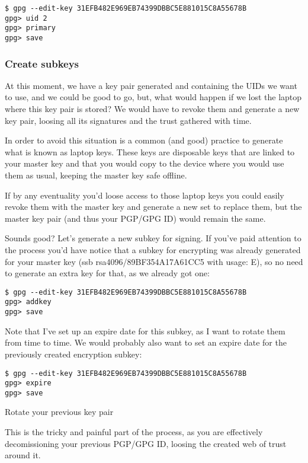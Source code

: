 \begin{verbatim}
$ gpg --edit-key 31EFB482E969EB74399DBBC5E881015C8A55678B
gpg> uid 2
gpg> primary
gpg> save
\end{verbatim}

\subsubsection{Create subkeys}

At this moment, we have a key pair generated and containing the UIDs we want to use, and we could be good to go, but, what would happen if we lost the laptop where this key pair is stored? We would have to revoke them and generate a new key pair, loosing all its signatures and the trust gathered with time.

In order to avoid this situation is a common (and good) practice to generate what is known as laptop keys. These keys are disposable keys that are linked to your master key and that you would copy to the device where you would use them as usual, keeping the master key safe offline.

If by any eventuality you’d loose access to those laptop keys you could easily revoke them with the master key and generate a new set to replace them, but the master key pair (and thus your PGP/GPG ID) would remain the same.

Sounds good? Let’s generate a new subkey for signing. If you’ve paid attention to the process you’d have notice that a subkey for encrypting was already generated for your master key (ssb rsa4096/89BF354A17A61CC5 with usage: E), so no need to generate an extra key for that, as we already got one:

\begin{verbatim}
$ gpg --edit-key 31EFB482E969EB74399DBBC5E881015C8A55678B
gpg> addkey
gpg> save
\end{verbatim}

Note that I’ve set up an expire date for this subkey, as I want to rotate them from time to time. We would probably also want to set an expire date for the previously created encryption subkey:

\begin{verbatim}
$ gpg --edit-key 31EFB482E969EB74399DBBC5E881015C8A55678B
gpg> expire
gpg> save
\end{verbatim}

Rotate your previous key pair

This is the tricky and painful part of the process, as you are effectively decomissioning your previous PGP/GPG ID, loosing the created web of trust around it.

